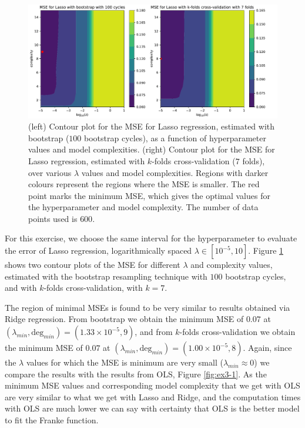\documentclass[10pt, a4paper]{article}
\begin{document}
    \begin{figure}[h]
        \centering
        \includegraphics[scale=0.55]{ex5_bs_bcs_100_cv_k_folds_7_n_lmd_50_n_600_noise_0.25.pdf}
        \caption{(left) Contour plot for the MSE for Lasso regression, estimated with bootstrap ($100$ bootstrap cycles), as a function of hyper\-parameter values and model complexities. (right) Contour plot for the MSE for Lasso regression, estimated with $k$-folds cross-validation ($7$ folds), over various $\lambda$ values and model complexities. Regions with darker colours represent the regions where the MSE is smaller. The red point marks the minimum MSE, which gives the optimal values for the hyperparameter and model complexity. The number of data points used is $600$.}
        \label{fig:ex5}
    \end{figure}
    
    For this exercise, we choose the same interval for the hyperparameter to evaluate the error of Lasso regression, logarithmically spaced $\lambda \in [10^{-5}, 10]$. Figure \ref{fig:ex5} shows two contour plots of the MSE for different $\lambda$ and complexity values, estimated with the bootstrap resampling technique with $100$ bootstrap cycles, and with $k$-folds cross-validation, with $k=7$.
    
    The region of minimal MSEs is found to be very similar to results obtained via Ridge regression. From bootstrap we obtain the minimum MSE of $0.07$ at $(\lambda_{min},\text{deg}_{min}) = (1.33 \times 10^{-5}, 9)$, and from $k$-folds cross-validation we obtain the minimum MSE of $0.07$ at $(\lambda_{min},\text{deg}_{min}) = (1.00 \times 10^{-5}, 8)$. Again, since the $\lambda$ values for which the MSE is minimum are very small ($\lambda_{min} \approx 0$) we compare the results with the results from OLS, Figure \ref{fig:ex3-1}. As the minimum MSE values and corresponding model complexity that we get with OLS are very similar to what we get with Lasso and Ridge, and the computation times with OLS are much lower we can say with certainty that OLS is the better model to fit the Franke function.
\end{document}
